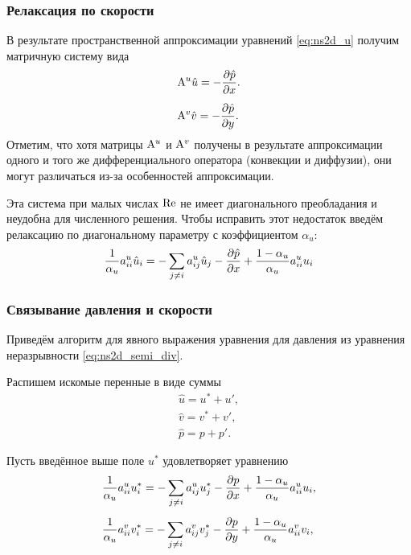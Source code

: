 \subsubsection{Релаксация по скорости}
\label{sec:simple-algo}

В результате пространственной аппроксимации уравнений \cref{eq:ns2d_u}
получим матричную систему вида
\begin{align}
\nonumber
&{\rm A}^u \hat u = -\frac{\partial \hat p}{\partial x}. \\[5pt]
\nonumber
&{\rm A}^v \hat v = -\frac{\partial \hat p}{\partial y}.
\end{align}
Отметим, что хотя матрицы ${\rm A}^u$ и ${\rm A}^v$ получены в результате
аппроксимации одного и того же дифференциального оператора (конвекции и диффузии),
они могут различаться из-за особенностей аппроксимации.

Эта система при малых числах $\mathrm{Re}$  не имеет диагонального преобладания
и неудобна для численного решения. Чтобы исправить этот недостаток
введём релаксацию по диагональному параметру с коэффициентом $\alpha_u$:
\begin{equation}
\label{eq:ns2d_linearized_u}
\frac{1}{\alpha_u} a^u_{ii}\hat u_i = -\sum_{j\neq i} a^u_{ij} \hat u_j -\frac{\partial \hat p}{\partial x} + \frac{1 - \alpha_u}{\alpha_u} a^u_{ii} u_i
\end{equation}

\subsubsection{Связывание давления и скорости}
\label{sec:ns2d_segragated}
Приведём алгоритм для явного выражения уравнения для давления из
уравнения неразрывности \eqref{eq:ns2d_semi_div}.

Распишем искомые перенные в виде суммы 
\begin{equation}
    \label{eq:ns2d_decomp}
\begin{array}{l}
    \hat u = u^* + u',\\
    \hat v = v^* + v',\\
    \hat p = p + p'.
\end{array}
\end{equation}

Пусть введённое выше поле $u^*$ удовлетворяет уравнению
\begin{align}
    \label{eq:ns2d_ustar}
    &\frac{1}{\alpha_u} a^u_{ii} u^*_i = -\sum_{j\neq i} a^u_{ij} u^*_j - \frac{\partial p}{\partial x} + \frac{1 - \alpha_u}{\alpha_u} a^u_{ii} u_i, \\[5pt]
    \label{eq:ns2d_vstar}
    &\frac{1}{\alpha_u} a^v_{ii} v^*_i = -\sum_{j\neq i} a^v_{ij} v^*_j - \frac{\partial p}{\partial y} + \frac{1 - \alpha_u}{\alpha_u} a^v_{ii} v_i,
\end{align}


